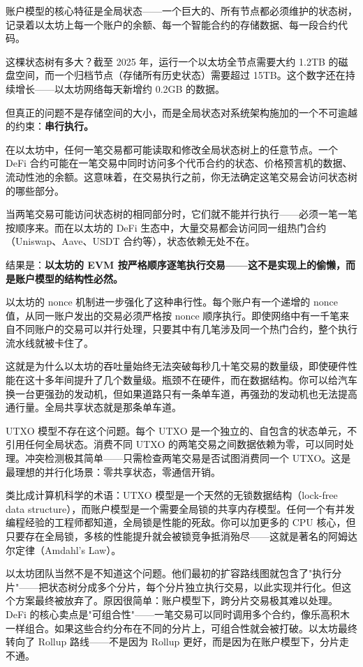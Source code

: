 \documentclass[a4paper,12pt,openany]{ctexbook}
\begin{document}
账户模型的核心特征是全局状态——一个巨大的、所有节点都必须维护的状态树，记录着以太坊上每一个账户的余额、每一个智能合约的存储数据、每一段合约代码。

这棵状态树有多大？截至 2025 年，运行一个以太坊全节点需要大约 1.2TB 的磁盘空间，而一个归档节点（存储所有历史状态）需要超过 15TB。这个数字还在持续增长——以太坊网络每天新增约 0.2GB 的数据。

但真正的问题不是存储空间的大小，而是全局状态对系统架构施加的一个不可逾越的约束：\textbf{串行执行。}

在以太坊中，任何一笔交易都可能读取和修改全局状态树上的任意节点。一个 DeFi 合约可能在一笔交易中同时访问多个代币合约的状态、价格预言机的数据、流动性池的余额。这意味着，在交易执行之前，你无法确定这笔交易会访问状态树的哪些部分。

当两笔交易可能访问状态树的相同部分时，它们就不能并行执行——必须一笔一笔按顺序来。而在以太坊的 DeFi 生态中，大量交易都会访问同一组热门合约（Uniswap、Aave、USDT 合约等），状态依赖无处不在。

结果是：\textbf{以太坊的 EVM 按严格顺序逐笔执行交易——这不是实现上的偷懒，而是账户模型的结构性必然。}

以太坊的 nonce 机制进一步强化了这种串行性。每个账户有一个递增的 nonce 值，从同一账户发出的交易必须严格按 nonce 顺序执行。即使网络中有一千笔来自不同账户的交易可以并行处理，只要其中有几笔涉及同一个热门合约，整个执行流水线就被卡住了。

这就是为什么以太坊的吞吐量始终无法突破每秒几十笔交易的数量级，即使硬件性能在这十多年间提升了几个数量级。瓶颈不在硬件，而在数据结构。你可以给汽车换一台更强劲的发动机，但如果道路只有一条单车道，再强劲的发动机也无法提高通行量。全局共享状态就是那条单车道。

UTXO 模型不存在这个问题。每个 UTXO 是一个独立的、自包含的状态单元，不引用任何全局状态。消费不同 UTXO 的两笔交易之间数据依赖为零，可以同时处理。冲突检测极其简单——只需检查两笔交易是否试图消费同一个 UTXO。这是最理想的并行化场景：零共享状态，零通信开销。

类比成计算机科学的术语：UTXO 模型是一个天然的无锁数据结构（lock-free data structure），而账户模型是一个需要全局锁的共享内存模型。任何一个有并发编程经验的工程师都知道，全局锁是性能的死敌。你可以加更多的 CPU 核心，但只要存在全局锁，多核的性能提升就会被锁竞争抵消殆尽——这就是著名的阿姆达尔定律（Amdahl's Law）。

以太坊团队当然不是不知道这个问题。他们最初的扩容路线图就包含了"执行分片"——把状态树分成多个分片，每个分片独立执行交易，以此实现并行化。但这个方案最终被放弃了。原因很简单：账户模型下，跨分片交易极其难以处理。DeFi 的核心卖点是"可组合性"——一笔交易可以同时调用多个合约，像乐高积木一样组合。如果这些合约分布在不同的分片上，可组合性就会被打破。以太坊最终转向了 Rollup 路线——不是因为 Rollup 更好，而是因为在账户模型下，分片走不通。
\end{document}

